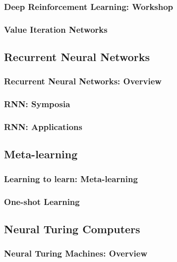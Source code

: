 \documentclass[11pt,
               hyperref={colorlinks,citecolor=pink,linkcolor=red,urlcolor=blue}
               ]{beamer}
\begin{document}
  \begin{frame}
    \frametitle{Deep Reinforcement Learning: Workshop}

  \end{frame}

  \begin{frame}
    \frametitle{Value Iteration Networks}

  \end{frame}

  \subsection{Recurrent Neural Networks}

  \begin{frame}
    \frametitle{Recurrent Neural Networks: Overview}

  \end{frame}

  \begin{frame}
    \frametitle{RNN: Symposia}

  \end{frame}

  \begin{frame}
    \frametitle{RNN: Applications}

  \end{frame}

  \subsection{Meta-learning}

  \begin{frame}
    \frametitle{Learning to learn: Meta-learning}

  \end{frame}

  \begin{frame}
    \frametitle{One-shot Learning}

  \end{frame}

  \subsection{Neural Turing Computers}

  \begin{frame}
    \frametitle{Neural Turing Machines: Overview}

  \end{frame}
\end{document}
